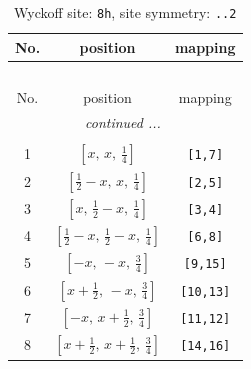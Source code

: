 \documentclass[fleqn,8pt]{jsarticle}
\begin{document}
\begin{longtable}{ccc}
\caption{Wyckoff site: {\tt 8h}, site symmetry: {\tt ..2}}
 \\
 \hline \hline
No. & position & mapping \\ \hline \endfirsthead

\multicolumn{2}{l}{\tablename\ \thetable{}} \\
 \hline \hline
No. & position & mapping \\ \hline \endhead

 \hline \hline
\multicolumn{2}{r}{\footnotesize\it continued ...} \\ \endfoot

 \hline \hline
\multicolumn{2}{r}{} \\ \endlastfoot

1 & $\left[ x,\, x,\, \frac{1}{4} \right]$ & {\tt [1,7]} \\ \hline
2 & $\left[ \frac{1}{2} - x,\, x,\, \frac{1}{4} \right]$ & {\tt [2,5]} \\ \hline
3 & $\left[ x,\, \frac{1}{2} - x,\, \frac{1}{4} \right]$ & {\tt [3,4]} \\ \hline
4 & $\left[ \frac{1}{2} - x,\, \frac{1}{2} - x,\, \frac{1}{4} \right]$ & {\tt [6,8]} \\ \hline
5 & $\left[ - x,\, - x,\, \frac{3}{4} \right]$ & {\tt [9,15]} \\ \hline
6 & $\left[ x + \frac{1}{2},\, - x,\, \frac{3}{4} \right]$ & {\tt [10,13]} \\ \hline
7 & $\left[ - x,\, x + \frac{1}{2},\, \frac{3}{4} \right]$ & {\tt [11,12]} \\ \hline
8 & $\left[ x + \frac{1}{2},\, x + \frac{1}{2},\, \frac{3}{4} \right]$ & {\tt [14,16]} \\
\end{longtable}
\renewcommand{\arraystretch}{1.2}
\end{document}
